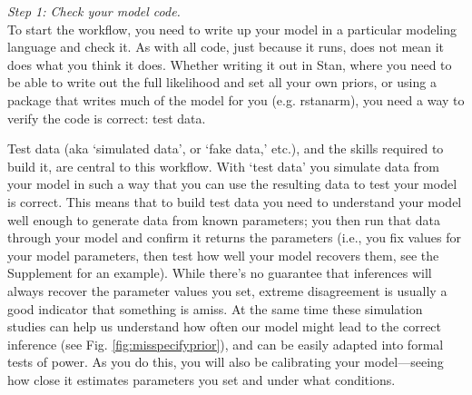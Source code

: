 \documentclass[11pt]{article}
\begin{document}
{\emph{Step 1: Check your model code.} \\ 
To start the workflow, you need to write up your model in a particular modeling language and check it. As with all code, just because it runs, does not mean it does what you think it does. Whether writing it out in \textsf{Stan}, where you need to be able to write out the full likelihood and set all your own priors, or using a package that writes much of the model for you (e.g. \textsf{rstanarm}), you need a way to verify the code is correct: test data.

Test data (aka `simulated data', or  `fake data,' etc.), and the skills required to build it, are central to this workflow. With `test data' you simulate data from your model in such a way that you can use the resulting data to test your model is correct. This means that to build test data you need to understand your model well enough to generate data from known parameters; you then run that data through your model and confirm it returns the parameters (i.e., you fix values for your model parameters, then test how well your model recovers them, see the Supplement for an example). While there's no guarantee that inferences will always recover the parameter values you set, extreme disagreement is usually a good indicator that something is amiss. At the same time these simulation studies can help us understand how often our model might lead to the correct inference (see Fig. \ref{fig:misspecifyprior}), and can be easily adapted into formal tests of power. As you do this, you will also be calibrating your model---seeing how close it estimates parameters you set and under what conditions. %


}
\end{document}
